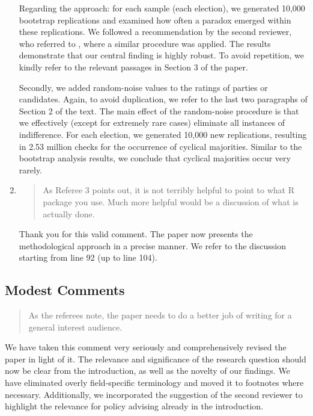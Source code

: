 \documentclass[a4paper, 12pt]{scrartcl}
\begin{document}
\begin{enumerate}[label=(\alph*)]
Regarding the approach: for each sample (each election), we generated 10,000 bootstrap replications and examined how often a paradox emerged within these replications. We followed a recommendation by the second reviewer, who referred to \cite{Darmann2019}, where a similar procedure was applied. The results demonstrate that our central finding is highly robust. To avoid repetition, we kindly refer to the relevant passages in Section 3 of the paper.

Secondly, we added random-noise values to the ratings of parties or candidates. Again, to avoid duplication, we refer to the last two paragraphs of Section 2 of the text. The main effect of the random-noise procedure is that we effectively (except for extremely rare cases) eliminate all instances of indifference. For each election, we generated 10,000 new replications, resulting in 2.53 million checks for the occurrence of cyclical majorities. Similar to the bootstrap analysis results, we conclude that cyclical majorities occur very rarely.

\item \begin{quote}
	As Referee 3 points out, it is not terribly helpful to point to what R package you use. Much more helpful would be a discussion of what is actually done.
\end{quote}
Thank you for this valid comment. The paper now presents the methodological approach in a precise manner. We refer to the discussion starting from line 92 (up to line 104).
\end{enumerate}

\subsection*{Modest Comments}
\begin{quotation}
 As the referees note, the paper needs to do a better job of writing for a general interest audience.
\end{quotation}

We have taken this comment very seriously and comprehensively revised the paper in light of it. The relevance and significance of the research question should now be clear from the introduction, as well as the novelty of our findings. We have eliminated overly field-specific terminology and moved it to footnotes where necessary. Additionally, we incorporated the suggestion of the second reviewer to highlight the relevance for policy advising already in the introduction.
\end{document}
